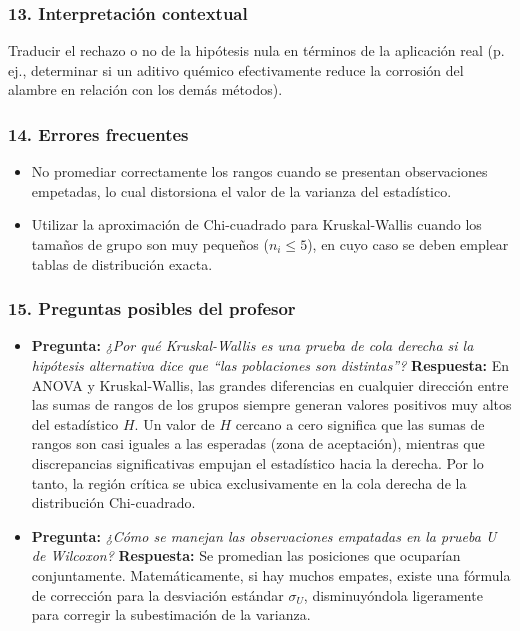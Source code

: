 \documentclass[11pt,a4paper]{article}
\begin{document}
\subsubsection{13. Interpretación contextual}
Traducir el rechazo o no de la hipótesis nula en términos de la aplicación real (p. ej., determinar si un aditivo quémico efectivamente reduce la corrosión del alambre en relación con los demás métodos).

\subsubsection{14. Errores frecuentes}
\begin{itemize}
    \item No promediar correctamente los rangos cuando se presentan observaciones empetadas, lo cual distorsiona el valor de la varianza del estadístico.
    \item Utilizar la aproximación de Chi-cuadrado para Kruskal-Wallis cuando los tamaños de grupo son muy pequeños ($n_i \le 5$), en cuyo caso se deben emplear tablas de distribución exacta.
\end{itemize}

\subsubsection{15. Preguntas posibles del profesor}
\begin{itemize}
    \item \textbf{Pregunta:} \textit{¿Por qué Kruskal-Wallis es una prueba de cola derecha si la hipótesis alternativa dice que ``las poblaciones son distintas''?}
    \textbf{Respuesta:} En ANOVA y Kruskal-Wallis, las grandes diferencias en cualquier dirección entre las sumas de rangos de los grupos siempre generan valores positivos muy altos del estadístico $H$. Un valor de $H$ cercano a cero significa que las sumas de rangos son casi iguales a las esperadas (zona de aceptación), mientras que discrepancias significativas empujan el estadístico hacia la derecha. Por lo tanto, la región crítica se ubica exclusivamente en la cola derecha de la distribución Chi-cuadrado.
    \item \textbf{Pregunta:} \textit{¿Cómo se manejan las observaciones empatadas en la prueba U de Wilcoxon?}
    \textbf{Respuesta:} Se promedian las posiciones que ocuparían conjuntamente. Matemáticamente, si hay muchos empates, existe una fórmula de corrección para la desviación estándar $\sigma_U$, disminuyóndola ligeramente para corregir la subestimación de la varianza.
\end{itemize}
\end{document}
